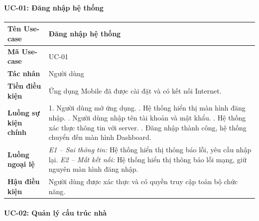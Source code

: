 \paragraph{UC-01: Đăng nhập hệ thống}

\begin{table}[H]
\centering
\renewcommand{\arraystretch}{1.4}
\begin{tabular}{|p{3.8cm}|p{10cm}|}
\hline
\textbf{Tên Use-case}       & Đăng nhập hệ thống \\ \hline
\textbf{Mã Use-case}        & UC-01 \\ \hline
\textbf{Tác nhân}           & Người dùng \\ \hline
\textbf{Tiền điều kiện}     & Ứng dụng Mobile đã được cài đặt và có kết nối Internet. \\ \hline
\textbf{Luồng sự kiện chính} & 
1. Người dùng mở ứng dụng. \newline
2. Hệ thống hiển thị màn hình đăng nhập. \newline
3. Người dùng nhập tên tài khoản và mật khẩu. \newline
4. Hệ thống xác thực thông tin với server. \newline
5. Đăng nhập thành công, hệ thống chuyển đến màn hình Dashboard. \\ \hline
\textbf{Luồng ngoại lệ}     & 
\textit{E1 -- Sai thông tin:} Hệ thống hiển thị thông báo lỗi, yêu cầu nhập lại. \newline
\textit{E2 -- Mất kết nối:} Hệ thống hiển thị thông báo lỗi mạng, giữ nguyên màn hình đăng nhập. \\ \hline
\textbf{Hậu điều kiện}      & Người dùng được xác thực và có quyền truy cập toàn bộ chức năng. \\ \hline
\end{tabular}
\end{table}

\paragraph{UC-02: Quản lý cấu trúc nhà}

